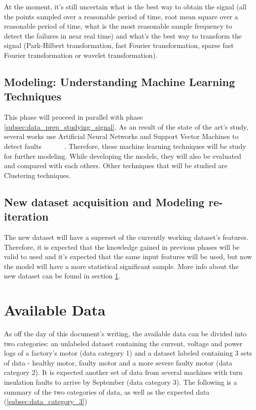 At the moment, it's still uncertain what is the best way to obtain the signal (all the points sampled over a reasonable period of time, root mean square over a reasonable period of time, what is the most reasonable sample frequency to detect the failures in near real time) and what's the best way to transform the signal (Park-Hilbert transformation, fast Fourier transformation, sparse fast Fourier transformation or wavelet transformation).


\subsection{Modeling: Understanding Machine Learning Techniques}
\label{subsec:modeling_under_machine_learning}

This phase will proceed in parallel with phase \ref{subsec:data_prep_studying_signal}. As an result of the state of the art's study, several works use Artificial Neural Networks and Support Vector Machines to detect faults ~\cite{Toma2011} ~\cite{Wolkiewicz2013} ~\cite{Patel2016} ~\cite{Jagadanand2015}. Therefore, these machine learning techniques will be study for further modeling. While developing the models, they will also be evaluated and compared with each others.  
Other techniques that will be studied are Clustering techniques.

\subsection{New dataset acquisition and Modeling re-iteration}
\label{subsec:reiteration}

The new dataset will have a superset of the currently working dataset's features. Therefore, it is expected that the knowledge gained in previous phases will be valid to used and it's expected that the same input features will be used, but now the model will have a more statistical significant sample. More info about the new dataset can be found in section \ref{sec:available_data}.


\section{Available Data}
\label{sec:available_data}

As off the day of this document's writing, the available data can be divided into two categories: an unlabeled dataset containing the current, voltage and power logs of a factory's motor (data category 1) and a dataset labeled containing 3 sets of data - healthy motor, faulty motor and a more severe faulty motor (data category 2).
It is expected another set of data from several machines with turn insulation faults to arrive by September (data category 3).
The following is a summary of the two categories of data, as well as the expected data (\ref{subsec:data_category_3})

